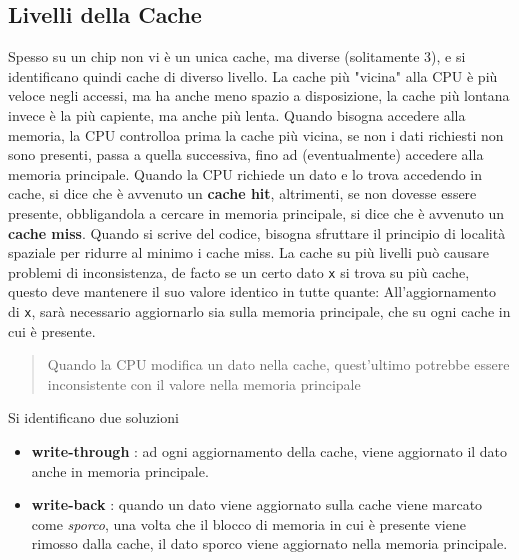 \documentclass[10pt, letterpaper]{report}
\begin{document}
\subsection{Livelli della Cache}
Spesso su un chip non vi è un unica cache, ma diverse (solitamente 3), e si identificano quindi cache di diverso livello. La cache più "vicina" alla CPU è più veloce negli accessi, ma ha anche meno spazio a disposizione, la cache più lontana invece è la più capiente, ma anche più lenta.\acc 
Quando bisogna accedere alla memoria, la CPU controlloa prima la cache più vicina, se non i dati richiesti non sono presenti, passa a quella successiva, fino ad (eventualmente) accedere alla memoria principale.\acc 
Quando la CPU richiede un dato e lo trova accedendo in cache, si dice che è avvenuto un \textbf{cache hit}, altrimenti, se non dovesse essere presente, obbligandola a cercare in memoria principale, si dice che è avvenuto un \textbf{cache miss}. Quando si scrive del codice, bisogna sfruttare il principio di località spaziale per ridurre al minimo i cache miss.\acc 
La cache su più livelli può causare problemi di inconsistenza, de facto se un certo dato \texttt{x} si trova su più cache, questo deve mantenere il suo valore identico in tutte quante: All'aggiornamento di \texttt{x}, sarà necessario aggiornarlo sia sulla memoria principale, che su ogni cache in cui è presente.\begin{quote}
    Quando la CPU modifica un dato nella cache, quest'ultimo potrebbe essere inconsistente con il valore nella memoria principale
\end{quote}
Si identificano due soluzioni\begin{itemize}
    \item \textbf{write-through} : ad ogni aggiornamento della cache, viene aggiornato il dato anche in memoria principale.
    \item \textbf{write-back} : quando un dato viene aggiornato sulla cache viene marcato come \textit{sporco}, una volta che il blocco di memoria in cui è presente viene rimosso dalla cache, il dato sporco viene aggiornato nella memoria principale.
\end{itemize}
\flowerLine
\end{document}
